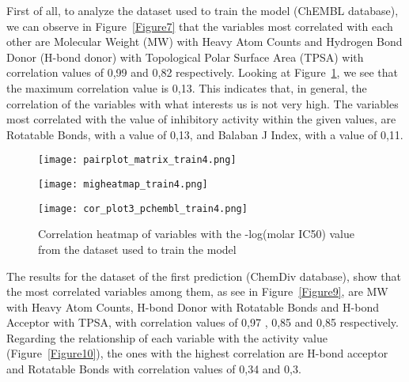 \documentclass[final,times,twocolumn,article]{elsarticle}
\begin{document}
 First of all, to analyze the dataset used to train the model (ChEMBL database), we can observe in Figure~\ref{Figure7} that the variables most correlated with each other are Molecular Weight (MW) with Heavy Atom Counts and Hydrogen Bond Donor (H-bond donor) with Topological Polar Surface Area (TPSA) with correlation values of 0,99 and 0,82 respectively. Looking at Figure~\ref{Figure8}, we see that the maximum correlation value is 0,13. This indicates that, in general, the correlation of the variables with what interests us is not very high. The variables most correlated with the value of inhibitory activity within the given values, are Rotatable Bonds, with a value of 0,13, and Balaban J Index, with a value of 0,11. 

\begin{figure*}
    \begin{subfigure}{0.5\textwidth}
        \texttt{[image: pairplot\_matrix\_train4.png]} 
        \caption{}%
    \end{subfigure}
    \hfill
    \begin{subfigure}{0.5\textwidth}
        \texttt{[image: migheatmap\_train4.png]}
        \caption{} %
    \end{subfigure}
    
    \caption{Correlation analysis from the dataset used to train the model (ChEMBL). (a) Pariplot correlation matrix. (b)Correlation matrix heatmap}
    \label{Figure7}
\end{figure*}

\begin{figure}[h]
    \centering 
     \texttt{[image: cor\_plot3\_pchembl\_train4.png]}	
     \caption{Correlation heatmap of variables with the -log(molar IC50) value from the dataset used to train the model} 
     \label{Figure8}
 \end{figure}

 The results for the dataset of the first prediction (ChemDiv database), show that the most correlated variables among them, as see in Figure~\ref{Figure9}, are MW with Heavy Atom Counts, H-bond Donor with Rotatable Bonds and H-bond Acceptor with TPSA, with correlation values of 0,97 , 0,85 and 0,85 respectively. Regarding the relationship of each variable with the activity value (Figure~\ref{Figure10}), the ones with the highest correlation are H-bond acceptor and Rotatable Bonds with correlation values of 0,34 and 0,3. 
\end{document}
